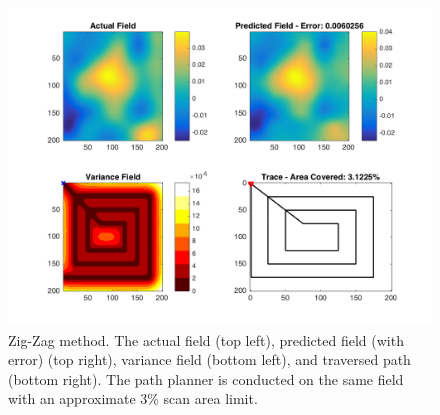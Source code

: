 \begin{figure}[htb!]
    \centering
    \includegraphics[width=0.8\linewidth]{figures/zz_200x200_3.png}
	\captionsetup{skip=0.25\baselineskip}
	\ssp
    \caption{Zig-Zag method. The actual field (top left), predicted field (with error) (top right), variance field (bottom left), and traversed path (bottom right). The path planner is conducted on the same field with an approximate 3\% scan area limit.}
\end{figure}
